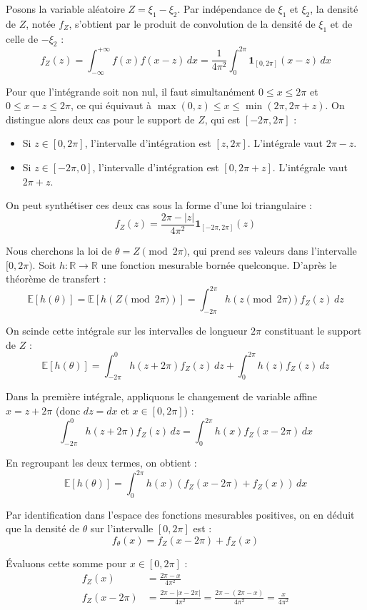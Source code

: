 \documentclass[12pt,a4paper]{report}
\begin{document}
Posons la variable aléatoire $Z = \xi_1 - \xi_2$. Par indépendance de $\xi_1$ et $\xi_2$, la densité de $Z$, notée $f_Z$, s'obtient par le produit de convolution de la densité de $\xi_1$ et de celle de $-\xi_2$ :
$$f_Z(z) = \int_{-\infty}^{+\infty} f(x) f(x - z) \, dx = \frac{1}{4\pi^2} \int_{0}^{2\pi} \mathbf{1}_{[0, 2\pi]}(x - z) \, dx$$

Pour que l'intégrande soit non nul, il faut simultanément $0 \le x \le 2\pi$ et $0 \le x - z \le 2\pi$, ce qui équivaut à $\max(0, z) \le x \le \min(2\pi, 2\pi + z)$. 
On distingue alors deux cas pour le support de $Z$, qui est $[-2\pi, 2\pi]$ :
\begin{itemize}
    \item Si $z \in [0, 2\pi]$, l'intervalle d'intégration est $[z, 2\pi]$. L'intégrale vaut $2\pi - z$.
    \item Si $z \in [-2\pi, 0]$, l'intervalle d'intégration est $[0, 2\pi + z]$. L'intégrale vaut $2\pi + z$.
\end{itemize}
On peut synthétiser ces deux cas sous la forme d'une loi triangulaire :
$$f_Z(z) = \frac{2\pi - |z|}{4\pi^2} \mathbf{1}_{[-2\pi, 2\pi]}(z)$$

Nous cherchons la loi de $\theta = Z \pmod{2\pi}$, qui prend ses valeurs dans l'intervalle $[0, 2\pi)$. 
Soit $h : \mathbb{R} \to \mathbb{R}$ une fonction mesurable bornée quelconque. D'après le théorème de transfert :
$$\mathbb{E}[h(\theta)] = \mathbb{E}[h(Z \pmod{2\pi})] = \int_{-2\pi}^{2\pi} h(z \pmod{2\pi}) f_Z(z) \, dz$$

On scinde cette intégrale sur les intervalles de longueur $2\pi$ constituant le support de $Z$ :
$$\mathbb{E}[h(\theta)] = \int_{-2\pi}^{0} h(z + 2\pi) f_Z(z) \, dz + \int_{0}^{2\pi} h(z) f_Z(z) \, dz$$

Dans la première intégrale, appliquons le changement de variable affine $x = z + 2\pi$ (donc $dz = dx$ et $x \in [0, 2\pi]$) :
$$\int_{-2\pi}^{0} h(z + 2\pi) f_Z(z) \, dz = \int_{0}^{2\pi} h(x) f_Z(x - 2\pi) \, dx$$

En regroupant les deux termes, on obtient :
$$\mathbb{E}[h(\theta)] = \int_{0}^{2\pi} h(x) \left( f_Z(x - 2\pi) + f_Z(x) \right) \, dx$$

Par identification dans l'espace des fonctions mesurables positives, on en déduit que la densité de $\theta$ sur l'intervalle $[0, 2\pi]$ est :
$$f_\theta(x) = f_Z(x - 2\pi) + f_Z(x)$$

Évaluons cette somme pour $x \in [0, 2\pi]$ :
\begin{align*}
    f_Z(x) &= \frac{2\pi - x}{4\pi^2} \\
    f_Z(x - 2\pi) &= \frac{2\pi - |x - 2\pi|}{4\pi^2} = \frac{2\pi - (2\pi - x)}{4\pi^2} = \frac{x}{4\pi^2}
\end{align*}
\end{document}
